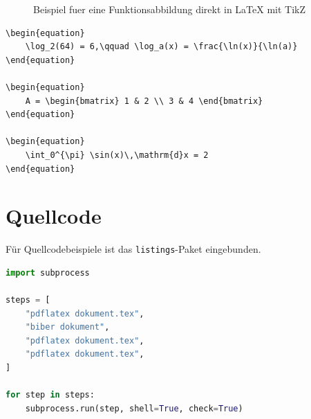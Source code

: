 \begin{figure}[H]
    \centering
    \caption{Beispiel fuer eine Funktionsabbildung direkt in LaTeX mit TikZ}
    \label{fig:mathe-graphen}
\end{figure}

\begin{lstlisting}[language={}, caption={Mathematische Syntax in LaTeX (Logarithmen, Matrizen, Integrale)}, label={code:mathe-syntax}]
\begin{equation}
    \log_2(64) = 6,\qquad \log_a(x) = \frac{\ln(x)}{\ln(a)}
\end{equation}

\begin{equation}
    A = \begin{bmatrix} 1 & 2 \\ 3 & 4 \end{bmatrix}
\end{equation}

\begin{equation}
    \int_0^{\pi} \sin(x)\,\mathrm{d}x = 2
\end{equation}
\end{lstlisting}

\section{Quellcode}
Für Quellcodebeispiele ist das \texttt{listings}-Paket eingebunden.

\begin{lstlisting}[language=Python, caption={Beispielhafter Build-Ablauf fuer die LaTeX-Vorlage}, label={code:python}]
import subprocess

steps = [
    "pdflatex dokument.tex",
    "biber dokument",
    "pdflatex dokument.tex",
    "pdflatex dokument.tex",
]

for step in steps:
    subprocess.run(step, shell=True, check=True)
\end{lstlisting}

